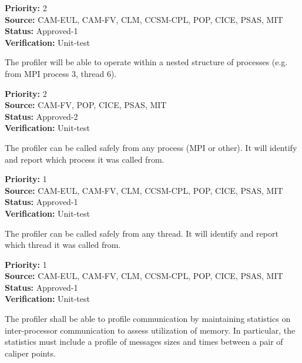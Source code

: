 \begin{reqlist}
{\bf Priority:} 2 \\
{\bf Source:} CAM-EUL, CAM-FV, CLM, CCSM-CPL, POP, CICE, PSAS, MIT \\
{\bf Status:} Approved-1 \\
{\bf Verification:} Unit-test
\end{reqlist}


The profiler will be able to operate within a nested structure of processes (e.g.
from MPI process 3, thread 6).

\begin{reqlist}
{\bf Priority:} 2 \\
{\bf Source:}  CAM-FV, POP, CICE, PSAS, MIT \\
{\bf Status:} Approved-2 \\
{\bf Verification:} Unit-test 
\end{reqlist}


The profiler can be called safely from any process (MPI or other).  It will 
identify and report which process it was called from.

\begin{reqlist}
{\bf Priority:} 1 \\
{\bf Source:} CAM-EUL, CAM-FV, CLM, CCSM-CPL, POP, CICE, PSAS, MIT \\
{\bf Status:} Approved-1 \\
{\bf Verification:} Unit-test 
\end{reqlist}


The profiler can be called safely from any thread.  It will 
identify and report which thread it was called from.

\begin{reqlist}
{\bf Priority:} 1 \\
{\bf Source:} CAM-EUL, CAM-FV, CLM, CCSM-CPL, POP, CICE, PSAS, MIT \\
{\bf Status:} Approved-1 \\
{\bf Verification:} Unit-test 
\end{reqlist}


The profiler shall be able to profile communication by maintaining
statistics on inter-processor communication to assess utilization of
memory. In particular, the statistics must include a profile of
messages sizes and times between a pair of caliper points.

